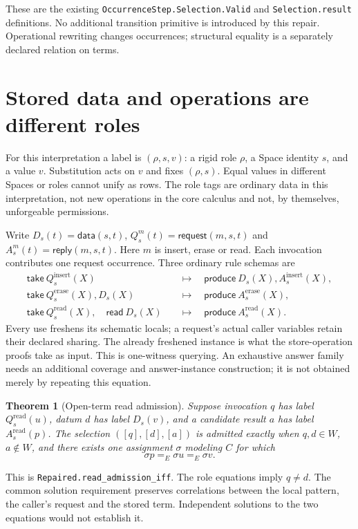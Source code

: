 \documentclass[11pt]{article}
\newtheorem{theorem}{Theorem}
\newcommand{\data}{\mathsf{data}}
\newcommand{\req}{\mathsf{request}}
\newcommand{\rep}{\mathsf{reply}}
\newcommand{\take}{\mathsf{take}}
\newcommand{\readp}{\mathsf{read}}
\newcommand{\make}{\mathsf{produce}}
\newcommand{\code}[1]{\texttt{\small #1}}
\begin{document}
These are the existing \code{OccurrenceStep.Selection.Valid} and
\code{Selection.result} definitions. No additional transition primitive is
introduced by this repair. Operational rewriting changes occurrences;
structural equality is a separately declared relation on terms.

\section{Stored data and operations are different roles}

For this interpretation a label is $(\rho,s,v)$: a rigid role $\rho$,
a Space identity $s$, and a value $v$. Substitution acts on $v$ and fixes
$(\rho,s)$. Equal values in different Spaces or roles cannot unify as rows.
The role tags are ordinary data in this interpretation, not new operations
in the core calculus and not, by themselves, unforgeable permissions.

Write $D_s(t)=\data(s,t)$, $Q_s^m(t)=\req(m,s,t)$ and
$A_s^m(t)=\rep(m,s,t)$. Here $m$ is insert, erase or read.
Each invocation contributes one request occurrence. Three ordinary rule
schemas are
\begin{align*}
 \take\ Q_s^{\mathrm{insert}}(X)
   &\quad\longmapsto\quad
       \make\ D_s(X),A_s^{\mathrm{insert}}(X),\\
 \take\ Q_s^{\mathrm{erase}}(X),D_s(X)
   &\quad\longmapsto\quad
       \make\ A_s^{\mathrm{erase}}(X),\\
 \take\ Q_s^{\mathrm{read}}(X),\quad\readp\ D_s(X)
   &\quad\longmapsto\quad
       \make\ A_s^{\mathrm{read}}(X).
\end{align*}
Every use freshens its schematic locals; a request's actual caller variables
retain their declared sharing. The already freshened instance is what the
store-operation proofs take as input. This is one-witness querying. An
exhaustive answer family needs an additional coverage and answer-instance
construction; it is not obtained merely by repeating this equation.

\begin{theorem}[Open-term read admission]
Suppose invocation $q$ has label $Q_s^{\mathrm{read}}(u)$, datum $d$ has
label $D_s(v)$, and a candidate result $a$ has label
$A_s^{\mathrm{read}}(p)$. The selection $([q],[d],[a])$ is admitted exactly
when $q,d\in W$, $a\notin W$, and there exists one assignment $\sigma$
modeling $C$ for which
\[
       \sigma p =_E \sigma u =_E \sigma v.
\]
\end{theorem}
This is \code{Repaired.read\_admission\_iff}. The role equations imply
$q\ne d$. The common solution requirement preserves correlations between
the local pattern, the caller's request and the stored term. Independent
solutions to the two equations would not establish it.
\end{document}
